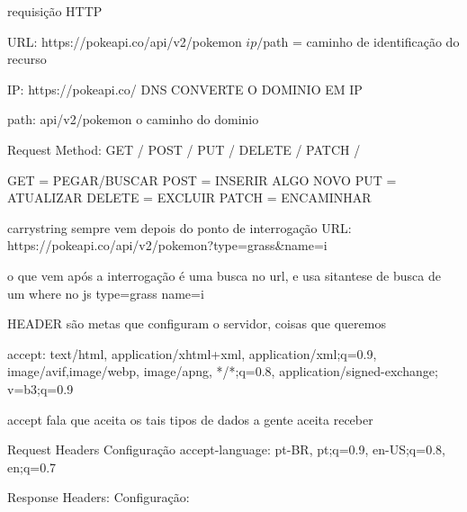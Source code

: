 requisição HTTP 

URL: https://pokeapi.co/api/v2/pokemon
    ${ip}/${path = caminho de identificação do recurso}

    IP: https://pokeapi.co/
    DNS CONVERTE O DOMINIO EM IP

    path: api/v2/pokemon
    o caminho do dominio

Request Method: GET / POST / PUT / DELETE / PATCH /

GET = PEGAR/BUSCAR 
POST = INSERIR ALGO NOVO 
PUT = ATUALIZAR 
DELETE = EXCLUIR
PATCH = ENCAMINHAR

carrystring sempre vem depois do ponto de interrogação
URL: https://pokeapi.co/api/v2/pokemon?type=grass&name=i  

o que vem após a interrogação é uma busca no url, 
e usa sitantese de busca de um where no js
type=grass 
name=i

HEADER são metas que configuram o servidor, coisas que queremos

accept: text/html,
application/xhtml+xml,
application/xml;q=0.9,
image/avif,image/webp,
image/apng,
*/*;q=0.8,
application/signed-exchange;
v=b3;q=0.9

accept fala que aceita os tais tipos de dados  a gente aceita receber

Request Headers{
Configuração
accept-language: pt-BR,
pt;q=0.9,
en-US;q=0.8,
en;q=0.7
}

Response Headers: 
Configuração: